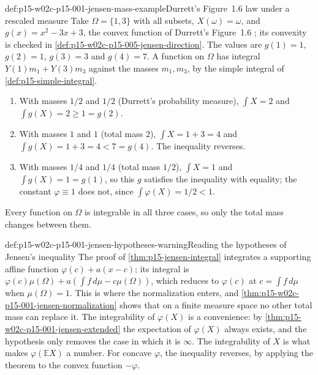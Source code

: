 \begin{hbexample}{def:p15-w02c-p15-001-jensen-mass-example}{Durrett's Figure~1.6 law under a rescaled measure}
Take \(\Omega=\{1,3\}\) with all subsets, \(X(\omega)=\omega\), and
\(g(x)=x^2-3x+3\), the convex function of Durrett's Figure~1.6
\cite[p.~30]{DurrettPTEAuthor2019}; its convexity is checked in
\cref{def:p15-w02c-p15-005-jensen-direction}. The values are
\(g(1)=1\), \(g(2)=1\), \(g(3)=3\) and \(g(4)=7\). A function on
\(\Omega\) has integral \(Y(1)m_1+Y(3)m_3\) against the masses
\(m_1,m_3\), by the simple integral of
\cref{def:p15-simple-integral}.
\begin{enumerate}
\item With masses \(1/2\) and \(1/2\) (Durrett's probability measure),
      \(\int X=2\) and \(\int g(X)=2\geq1=g(2)\).
\item With masses \(1\) and \(1\) (total mass \(2\)),
      \(\int X=1+3=4\) and \(\int g(X)=1+3=4<7=g(4)\). The inequality
      reverses.
\item With masses \(1/4\) and \(1/4\) (total mass \(1/2\)),
      \(\int X=1\) and \(\int g(X)=1=g(1)\), so this \(g\) satisfies the
      inequality with equality; the constant \(\varphi\equiv1\) does not,
      since \(\int\varphi(X)=1/2<1\).
\end{enumerate}
Every function on \(\Omega\) is integrable in all three cases, so only the
total mass changes between them.
\end{hbexample}

\begin{hbwarning}{def:p15-w02c-p15-001-jensen-hypotheses-warning}{Reading the hypotheses of Jensen's inequality}
The proof of \cref{thm:p15-jensen-integral} integrates a supporting
affine function \(\varphi(c)+a(x-c)\); its integral is
\(\varphi(c)\mu(\Omega)+a(\int f\,d\mu-c\mu(\Omega))\), which reduces
to \(\varphi(c)\) at \(c=\int f\,d\mu\) when \(\mu(\Omega)=1\). This is
where the normalization enters, and
\cref{thm:p15-w02c-p15-001-jensen-normalization} shows that on a finite
measure space no other total mass can replace it. The integrability of
\(\varphi(X)\) is a convenience: by
\cref{thm:p15-w02c-p15-001-jensen-extended} the expectation of
\(\varphi(X)\) always exists, and the hypothesis only removes the case in
which it is \(\infty\). The integrability of \(X\) is what makes
\(\varphi(\mathbb EX)\) a number. For concave \(\varphi\), the
inequality reverses, by applying the theorem to the convex function
\(-\varphi\).
\end{hbwarning}


